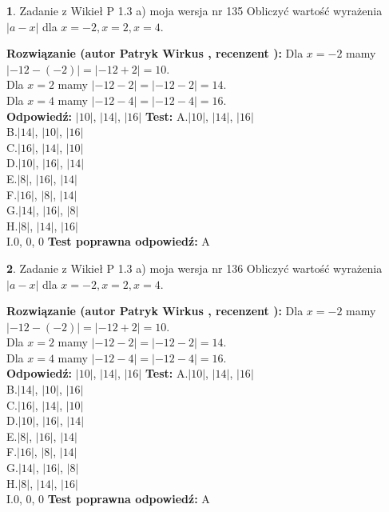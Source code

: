 \documentclass[12pt, a4paper]{article}
\theoremstyle{definition} %
\newtheorem{zad}{}
\newcommand{\zadStart}[1]{\begin{zad}#1\newline}
\newcommand{\zadStop}{\end{zad}}
\newcommand{\rozwStart}[2]{\noindent \textbf{Rozwiązanie (autor #1 , recenzent #2): }\newline}
\newcommand{\rozwStop}{\newline}
\newcommand{\odpStart}{\noindent \textbf{Odpowiedź:}\newline}
\newcommand{\odpStop}{\newline}
\newcommand{\testStart}{\noindent \textbf{Test:}\newline}
\newcommand{\testStop}{\newline}
\newcommand{\kluczStart}{\noindent \textbf{Test poprawna odpowiedź:}\newline}
\newcommand{\kluczStop}{\newline}
\begin{document}
\zadStart{Zadanie z Wikieł P 1.3 a) moja wersja nr 135}
Obliczyć wartość wyrażenia $|a - x|$ dla $x=-2,x=2,x=4$.
\zadStop
\rozwStart{Patryk Wirkus}{}
Dla $x = -2$ mamy $|-12 - (-2)| = |-12 + 2| = 10$.\\
Dla $x = 2$ mamy $|-12 - 2| = |-12 - 2| = 14$.\\
Dla $x = 4$ mamy $|-12 - 4| = |-12 - 4| = 16$.\\
\rozwStop
\odpStart
$|10|$, $|14|$, $|16|$
\odpStop
\testStart
A.$|10|$, $|14|$, $|16|$\\
B.$|14|$, $|10|$, $|16|$\\
C.$|16|$, $|14|$, $|10|$\\
D.$|10|$, $|16|$, $|14|$\\
E.$|8|$, $|16|$, $|14|$\\
F.$|16|$, $|8|$, $|14|$\\
G.$|14|$, $|16|$, $|8|$\\
H.$|8|$, $|14|$, $|16|$\\
I.$0$, $0$, $0$
\testStop
\kluczStart
A
\kluczStop



\zadStart{Zadanie z Wikieł P 1.3 a) moja wersja nr 136}
Obliczyć wartość wyrażenia $|a - x|$ dla $x=-2,x=2,x=4$.
\zadStop
\rozwStart{Patryk Wirkus}{}
Dla $x = -2$ mamy $|-12 - (-2)| = |-12 + 2| = 10$.\\
Dla $x = 2$ mamy $|-12 - 2| = |-12 - 2| = 14$.\\
Dla $x = 4$ mamy $|-12 - 4| = |-12 - 4| = 16$.\\
\rozwStop
\odpStart
$|10|$, $|14|$, $|16|$
\odpStop
\testStart
A.$|10|$, $|14|$, $|16|$\\
B.$|14|$, $|10|$, $|16|$\\
C.$|16|$, $|14|$, $|10|$\\
D.$|10|$, $|16|$, $|14|$\\
E.$|8|$, $|16|$, $|14|$\\
F.$|16|$, $|8|$, $|14|$\\
G.$|14|$, $|16|$, $|8|$\\
H.$|8|$, $|14|$, $|16|$\\
I.$0$, $0$, $0$
\testStop
\kluczStart
A
\kluczStop
\end{document}
